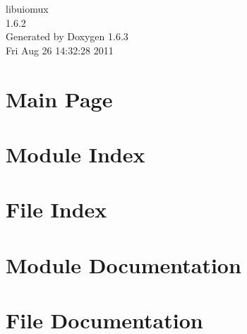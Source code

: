 \documentclass[a4paper]{book}
\begin{document}
\begin{titlepage}
\vspace*{7cm}
\begin{center}
{\Large libuiomux \\[1ex]\large 1.6.2 }\\
\vspace*{1cm}
{\large Generated by Doxygen 1.6.3}\\
\vspace*{0.5cm}
{\small Fri Aug 26 14:32:28 2011}\\
\end{center}
\end{titlepage}
\clearemptydoublepage
{}
\tableofcontents
\clearemptydoublepage
{}
\chapter{Main Page}
\label{index}
\chapter{Module Index}

\chapter{File Index}

\chapter{Module Documentation}



\chapter{File Documentation}





\printindex
\end{document}
